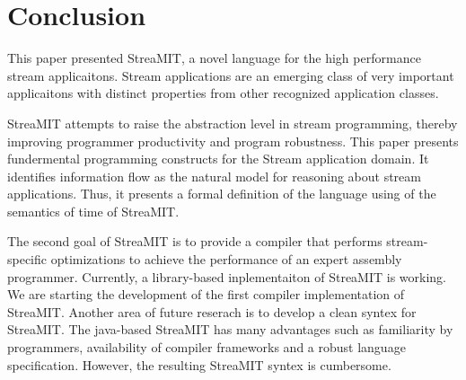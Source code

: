 \section{Conclusion}
This paper presented StreaMIT, a novel language for the high
performance stream applicaitons.
Stream applications are an emerging class of very important
applicaitons with distinct properties from other recognized
application classes.

StreaMIT attempts to raise the abstraction level in stream
programming, thereby improving programmer productivity and program
robustness. This paper presents fundermental programming constructs
for the Stream application domain. It identifies information flow as
the natural model for reasoning about stream applications. Thus, it
presents a formal definition of the language using of the semantics of
time of StreaMIT. 

The second goal of StreaMIT is to provide a compiler that performs
stream-specific optimizations to achieve the performance of an expert
assembly programmer. Currently, a library-based inplementaiton of
StreaMIT is working. We are starting the development of the first
compiler implementation of StreaMIT. Another area of future reserach
is to develop a clean syntex for StreaMIT. The java-based StreaMIT has
many advantages such as familiarity by programmers, availability of
compiler frameworks and a robust language specification. However, the
resulting StreaMIT syntex is cumbersome.
